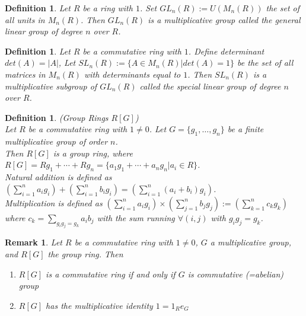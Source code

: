 \documentclass[a4paper,sfsidenotes,openany]{tufte-book}
\theoremstyle{theorem}
\newtheorem{definition}[theorem]{Definition}
\newtheorem{remark}[theorem]{Remark}
\begin{document}
\begin{fullwidth}
\begin{definition}
Let $R$ be a ring with $1$. Set $GL_n(R) := U(M_n(R))$ the set of all units in $M_n(R)$. Then $GL_n(R)$ is a multiplicative group called the \textit{{\color{blue} general linear group of degree $n$ over $R$}}.
\end{definition}
\>

\begin{definition}
Let $R$ be a commutative ring with $1$. Define determinant $det(A) = \left| A \right|$, Let $SL_n(R) := \{A \in M_n(R) | det(A) = 1\}$ be the set of all matrices in $M_n(R)$ with determinants equal to $1$. Then $SL_n(R)$ is a multiplicative subgroup of $GL_n(R)$ called the \textit{{\color{blue} special linear group of degree $n$ over $R$}}.
\end{definition}
\>

\begin{definition}
\textit{{\color{blue} (Group Rings $R[G]$)}}\\
Let $R$	be a commutative ring with $1 \neq 0$. Let $G = \{g_1, \ldots, g_n\}$ be a finite multiplicative group of order $n$.\\
Then $R[G]$ is a \textit{{\color{blue} group ring}}, where $R[G] = Rg_1 + \cdots + Rg_n = \{a_1 g_1 + \cdots + a_n g_n | a_i \in R\}$.\\
Natural addition is defined as $(\sum_{i=1}^{n} a_i g_i)+ (\sum_{i=1}^{n} b_i g_i) = (\sum_{i=1}^{n} (a_i + b_i) g_i)$.\\
Multiplication is defined as $(\sum_{i=1}^{n} a_i g_i) \times (\sum_{j=1}^{n} b_j g_j) := (\sum_{k=1}^{n} c_k g_k)$ where $c_k=\sum_{g_i g_j = g_k} a_i b_j$ with the sum running $\forall (i, j)$ with $g_i g_j = g_k$.\\
\end{definition}
\>

\begin{remark}
Let $R$ be a commutative ring with $1 \neq 0$, $G$ a multiplicative group, and $R[G]$ the group ring. Then
\begin{enumerate}[label=(\roman*),leftmargin=0pt, itemindent=4em, align=left]
\item $R[G]$ is a commutative ring if and only if $G$ is commutative (=abelian) group
\item $R[G]$ has the multiplicative identity $1=1_R e_G$
\end{enumerate}
\end{remark}
\>


\end{fullwidth}
\end{document}
